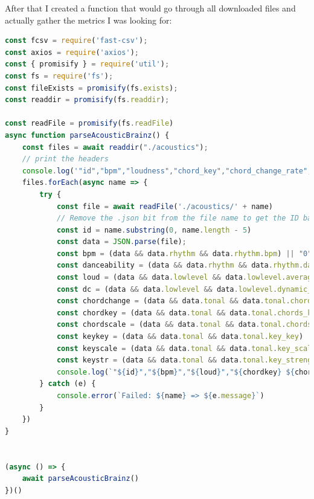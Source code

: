 \documentclass[10pt, a4paper]{article}
\begin{document}
After that I created a function that would go through all downloaded files and actually gather the metrics I was looking for:

\begin{lstlisting}[language=JavaScript, label=lst:acousticbrainzParsing, caption = Parsing the acousticbrainz files to turn the relevant metrics into csv format ]
const fcsv = require('fast-csv');
const axios = require('axios');
const { promisify } = require('util');
const fs = require('fs');
const fileExists = promisify(fs.exists);
const readdir = promisify(fs.readdir);

const readFile = promisify(fs.readFile)
async function parseAcousticBrainz() {
	const files = await readdir("./acoustics");
	// print the headers
	console.log('"id","bpm","loudness","chord_key","chord_change_rate","song_key","key_strength","danceability","dynamic_complexity"')
	files.forEach(async name => {
		try {
			const file = await readFile('./acoustics/' + name)
			// Remove the .json bit from the file name to get the ID back
			const id = name.substring(0, name.length - 5)
			const data = JSON.parse(file);
			const bpm = (data && data.rhythm && data.rhythm.bpm) || "0"
			const danceability = (data && data.rhythm && data.rhythm.danceability) || "0"
			const loud = (data && data.lowlevel && data.lowlevel.average_loudness) || "0"
			const dc = (data && data.lowlevel && data.lowlevel.dynamic_complexity) || "0"
			const chordchange = (data && data.tonal && data.tonal.chords_changes_rate) || "0"
			const chordkey = (data && data.tonal && data.tonal.chords_key) || ""
			const chordscale = (data && data.tonal && data.tonal.chords_scale) || ""
			const keykey = (data && data.tonal && data.tonal.key_key) || ""
			const keyscale = (data && data.tonal && data.tonal.key_scale) || ""
			const keystr = (data && data.tonal && data.tonal.key_strength) || "0"
			console.log(`"${id}","${bpm}","${loud}","${chordkey} ${chordscale}","${chordchange}","${keykey} ${keyscale}","${keystr}","${danceability}","${dc}"`)
		} catch (e) {
			console.error(`Failed: ${name} => ${e.message}`)
		}
	})
}


(async () => {
	await parseAcousticBrainz()
})()

\end{lstlisting}
\end{document}
